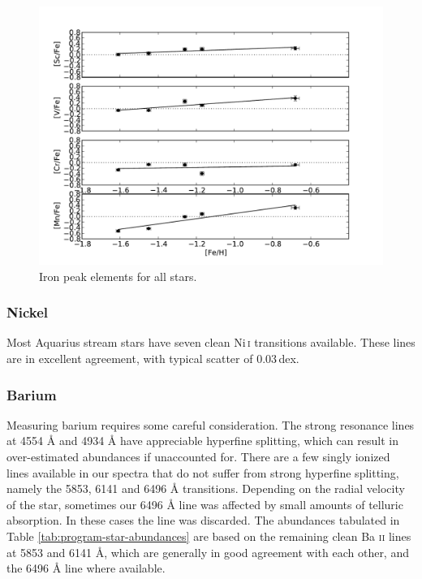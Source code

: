 \documentclass{emulateapj}
\begin{document}
\begin{figure}[h]
	\includegraphics[width=\columnwidth]{./figures/aquarius-fe-peak.pdf}
	\caption{Iron peak elements for all stars.}
	\label{fig:fe-peak-elements}
\end{figure}


\subsubsection{Nickel}
Most Aquarius stream stars have seven clean Ni\,\textsc{i} transitions available. These lines are in excellent agreement, with typical scatter of 0.03\,dex.


\subsubsection{Barium}

Measuring barium requires some careful consideration. The strong resonance lines at 4554 {\AA} and 4934 {\AA} have appreciable hyperfine splitting, which can result in over-estimated abundances if unaccounted for. There are a few singly ionized lines available in our spectra that do not suffer from strong hyperfine splitting, namely the 5853, 6141 and 6496 {\AA} transitions. Depending on the radial velocity of the star, sometimes our 6496 {\AA} line was affected by small amounts of telluric absorption. In these cases the line was discarded. The abundances tabulated in Table \ref{tab:program-star-abundances} are based on the remaining clean Ba \textsc{ii} lines at 5853 and 6141 {\AA}, which are generally in good agreement with each other, and the 6496 {\AA} line where available.
\end{document}

